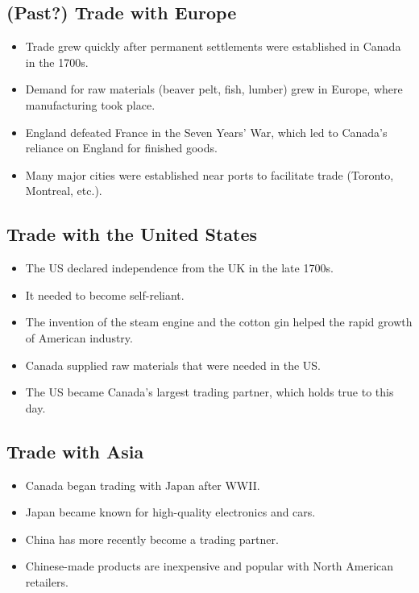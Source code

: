\subsection{(Past?) Trade with Europe}

\begin{itemize}
    \item Trade grew quickly after permanent settlements were established in Canada in the 1700s.
    \item Demand for raw materials (beaver pelt, fish, lumber) grew in Europe, where manufacturing took place.
    \item England defeated France in the Seven Years' War, which led to Canada's reliance on England for finished goods.
    \item Many major cities were established near ports to facilitate trade (Toronto, Montreal, etc.).  
\end{itemize}

\subsection{Trade with the United States}

\begin{itemize}
    \item The US declared independence from the UK in the late 1700s.
    \item It needed to become self-reliant.
    \item The invention of the steam engine and the cotton gin helped the rapid growth of American industry.
    \item Canada supplied raw materials that were needed in the US.
    \item The US became Canada's largest trading partner, which holds true to this day.
\end{itemize}

\subsection{Trade with Asia}

\begin{itemize}
    \item Canada began trading with Japan after WWII.
    \item Japan became known for high-quality electronics and cars.
    \item China has more recently become a trading partner.
    \item Chinese-made products are inexpensive and popular with North American retailers.
\end{itemize}
 
